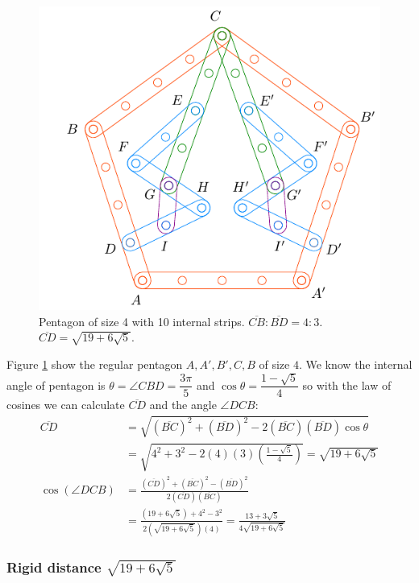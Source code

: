 \documentclass[11pt]{article}
\begin{document}
\begin{figure}[H]
\centering
\includegraphics[scale=1.1]{4/penta4-10a}
\caption{Pentagon of size 4 with 10 internal strips. $\overline{CB} : \overline{BD} = 4:3$. $\overline{CD} = \sqrt{19 + 6\sqrt5}$.}
\label{fig:penta4-10a}
\end{figure}

Figure \ref{fig:penta4-10a} show the regular pentagon $A,A',B',C,B$ of size $4$. We know the internal angle of pentagon is $\theta=\angle{CBD}=\dfrac{3\pi}5$ and $\cos\theta=\dfrac{1-\sqrt5}4$ so with the law of cosines we can calculate $\overline{CD}$ and the angle $\angle{DCB}$:
\begin{align}
\overline{CD} &= \sqrt{(\overline{BC})^2 + (\overline{BD})^2
 - 2(\overline{BC})(\overline{BD})\cos\theta} \nonumber\\
 &= \sqrt{4^2 + 3^2 - 2(4)(3)\left(\frac{1-\sqrt5}4\right)} = \sqrt{19+6\sqrt5}\\
%
\cos(\angle{DCB}) &= \frac{(\overline{CD})^2 + (\overline{BC})^2 - (\overline{BD})^2}
 {2(\overline{CD})(\overline{BC})} \nonumber\\
 &= \frac{(19+6\sqrt5) + 4^2 - 3^2}{2\left(\sqrt{19+6\sqrt5}\right)(4)}
  = \frac{13 + 3\sqrt5}{4\sqrt{19+6\sqrt5}}
\end{align}

\subsubsection{Rigid distance  $\sqrt{19+6\sqrt5}$}
\end{document}
